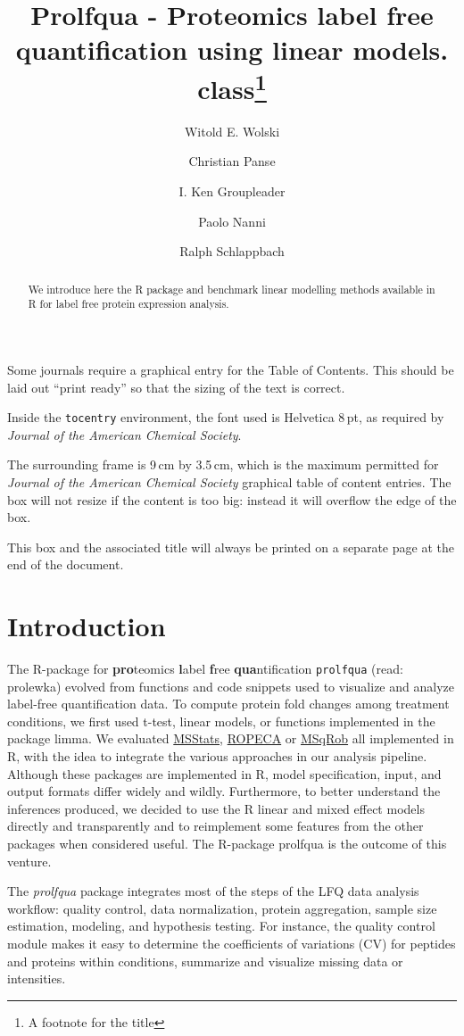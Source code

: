\documentclass[journal=jacsat,manuscript=article]{achemso}
\author{Witold E. Wolski}
\author{Christian Panse}
\author{I. Ken Groupleader}
\affiliation{Department of Chemistry, Unknown University, Unknown Town}
\author{Paolo Nanni}
\affiliation{Lead Discovery, BigPharma, Big Town, USA}
\author{Ralph Schlappbach}
\affiliation{Department of Chemistry, Unknown University, Unknown Town}
\title[prolfqua]{Prolfqua - \textsf{Pro}teomics label free
quantification using linear models.
class\footnote{A footnote for the title}}
\begin{document}
\begin{abstract}
We introduce here the R package and benchmark linear modelling methods
available in R for label free protein expression analysis.
\end{abstract}
\begin{tocentry}
Some journals require a graphical entry for the Table of Contents.
This should be laid out ``print ready'' so that the sizing of the
text is correct.

Inside the \texttt{tocentry} environment, the font used is Helvetica
8\,pt, as required by \emph{Journal of the American Chemical
Society}.

The surrounding frame is 9\,cm by 3.5\,cm, which is the maximum
permitted for  \emph{Journal of the American Chemical Society}
graphical table of content entries. The box will not resize if the
content is too big: instead it will overflow the edge of the box.

This box and the associated title will always be printed on a
separate page at the end of the document.
\end{tocentry}

\hypertarget{introduction}{%
\section{Introduction}\label{introduction}}

The R-package for \textbf{pro}teomics \textbf{l}abel \textbf{f}ree
\textbf{qua}ntification \texttt{prolfqua} (read: prolewka) evolved from
functions and code snippets used to visualize and analyze label-free
quantification data. To compute protein fold changes among treatment
conditions, we first used t-test, linear models, or functions
implemented in the package limma. We evaluated
\href{10.18129/B9.bioc.MSstats}{MSStats},
\href{10.1038/s41598-017-05949-y}{ROPECA} or
\href{https://github.com/statOmics/MSqRob}{MSqRob} all implemented in R,
with the idea to integrate the various approaches in our analysis
pipeline. Although these packages are implemented in R, model
specification, input, and output formats differ widely and wildly.
Furthermore, to better understand the inferences produced, we decided to
use the R linear and mixed effect models directly and transparently and
to reimplement some features from the other packages when considered
useful. The R-package prolfqua is the outcome of this venture.

The \emph{prolfqua} package integrates most of the steps of the LFQ data
analysis workflow: quality control, data normalization, protein
aggregation, sample size estimation, modeling, and hypothesis testing.
For instance, the quality control module makes it easy to determine the
coefficients of variations (CV) for peptides and proteins within
conditions, summarize and visualize missing data or intensities.
\end{document}
